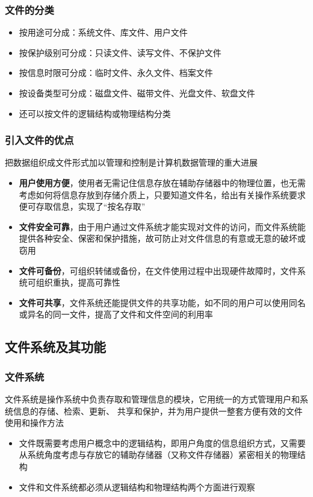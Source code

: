 \documentclass[cs4size,a4paper,10pt]{ctexart}
\begin{document}
	\subsubsection{文件的分类}
	\begin{itemize}
		\item 按用途可分成：系统文件、库文件、用户文件
		\item 按保护级别可分成：只读文件、读写文件、不保护文件
		\item 按信息时限可分成：临时文件、永久文件、档案文件
		\item 按设备类型可分成：磁盘文件、磁带文件、光盘文件、软盘文件
		\item 还可以按文件的逻辑结构或物理结构分类
	\end{itemize}

	\subsubsection{引入文件的优点}
	把数据组织成文件形式加以管理和控制是计算机数据管理的重大进展
	\begin{itemize}
		\item \textbf{用户使用方便}，使用者无需记住信息存放在辅助存储器中的物理位置，也无需考虑如何将信息存放到存储介质上，只要知道文件名，给出有关操作系统要求便可存取信息，实现了“按名存取”
		\item \textbf{文件安全可靠}，由于用户通过文件系统才能实现对文件的访问，而文件系统能提供各种安全、保密和保护措施，故可防止对文件信息的有意或无意的破坏或窃用
		\item \textbf{文件可备份}，可组织转储或备份，在文件使用过程中出现硬件故障时，文件系统可组织重执，提高可靠性
		\item \textbf{文件可共享}，文件系统还能提供文件的共享功能，如不同的用户可以使用同名或异名的同一文件，提高了文件和文件空间的利用率
	\end{itemize}

	\subsection{文件系统及其功能}

	\subsubsection{文件系统}
	文件系统是操作系统中负责存取和管理信息的模块，它用统一的方式管理用户和系统信息的存储、检索、更新、
	共享和保护，并为用户提供一整套方便有效的文件使用和操作方法
	\begin{itemize}
		\item 文件既需要考虑用户概念中的逻辑结构，即用户角度的信息组织方式，又需要从系统角度考虑与存放它的辅助存储器（又称文件存储器）紧密相关的物理结构
		\item 文件和文件系统都必须从逻辑结构和物理结构两个方面进行观察
	\end{itemize}
\end{document}
